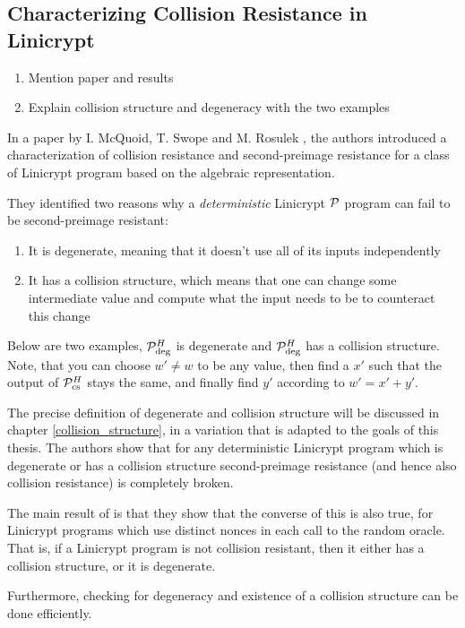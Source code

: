\subsection{Characterizing Collision Resistance in Linicrypt}

\begin{enumerate}
  \item Mention paper and results
  \item Explain collision structure and degeneracy with the two examples 
\end{enumerate}

In a paper by I. McQuoid, T. Swope and M. Rosulek
\cite[Characterizing Collision and Second-Preimage Resistance in Linicrypt]{RMS20},
the authors introduced a characterization of collision resistance
and second-preimage resistance for a class of Linicrypt program based on the algebraic representation.

They identified two reasons why a \textit{deterministic} Linicrypt $\P$ program can fail to be second-preimage resistant:
\begin{enumerate}
  \item It is degenerate, meaning that it doesn't use all of its inputs independently
  \item It has a collision structure,
    which means that one can change some intermediate value and compute what the input needs to be to counteract this change
\end{enumerate}

Below are two examples, $\P^\H_\textrm{deg}$ is degenerate and $\P^\H_\textrm{deg}$ has a collision structure.
Note, that you can choose $w' \neq w$ to be any value,
then find a $x'$ such that the output of $\P^\H_{\textrm{cs}}$ stays the same,
and finally find $y'$ according to $w' = x' + y'$.

\begin{pchstack}[center,space=2cm]
\end{pchstack}

The precise definition of degenerate and collision structure will be discussed in chapter \ref{collision_structure},
in a variation that is adapted to the goals of this thesis.
The authors show that for any deterministic Linicrypt program which is degenerate
or has a collision structure
second-preimage resistance (and hence also collision resistance) is completely broken.

The main result of \cite{RMS20} is that they show that the converse of this is also true,
for Linicrypt programs which use distinct nonces in each call to the random oracle.
That is, if a Linicrypt program is not collision resistant,
then it either has a collision structure, or it is degenerate.

Furthermore, checking for degeneracy and existence of a collision structure can be done efficiently.
